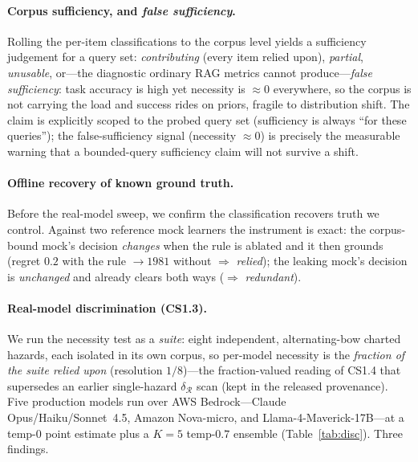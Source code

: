 \documentclass{article}
\newcommand{\regret}{\mathcal{R}}
\begin{document}
\paragraph{Corpus sufficiency, and \emph{false sufficiency}.} Rolling the per-item classifications to the
corpus level yields a sufficiency judgement for a query set: \emph{contributing} (every item
relied upon), \emph{partial}, \emph{unusable}, or---the diagnostic ordinary RAG metrics cannot
produce---\emph{false sufficiency}: task accuracy is high yet necessity is $\approx 0$ everywhere,
so the corpus is not carrying the load and success rides on priors, fragile to distribution shift.
The claim is explicitly scoped to the probed query set (sufficiency is always ``for these
queries''); the false-sufficiency signal (necessity $\approx 0$) is precisely the measurable
warning that a bounded-query sufficiency claim will not survive a shift.

\paragraph{Offline recovery of known ground truth.} Before the real-model sweep, we confirm the
classification recovers truth we control. Against two reference mock learners the instrument is exact: the
corpus-bound mock's decision \emph{changes} when the rule is ablated and it then grounds (regret $0.2$ with
the rule $\to 1981$ without $\Rightarrow$ \emph{relied}); the leaking mock's decision is \emph{unchanged}
and already clears both ways ($\Rightarrow$ \emph{redundant}).

\paragraph{Real-model discrimination (CS1.3).} We run the necessity test as a \emph{suite}: eight
independent, alternating-bow charted hazards, each isolated in its own corpus, so per-model necessity is
the \emph{fraction of the suite relied upon} (resolution $1/8$)---the fraction-valued reading of CS1.4
that supersedes an earlier single-hazard $\delta_{\regret}$ scan (kept in the released provenance).
Five production models run over AWS
Bedrock---Claude Opus/Haiku/Sonnet~4.5, Amazon Nova-micro, and Llama-4-Maverick-17B---at a temp-$0$ point
estimate plus a $K{=}5$ temp-$0.7$ ensemble (Table~\ref{tab:disc}). Three findings.
\end{document}
